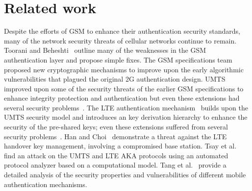 \documentclass[letterpaper,twocolumn]{sig-alternate}
\begin{document}
 

\section{Related work}

Despite the efforts of GSM to enhance their authentication security standards, many of the network security threats of cellular networks continue to remain. Toorani and Beheshti~\cite{toorani2008solutions} outline many of the weaknesses in the GSM authentication layer and propose simple fixes. The GSM specifications team~\cite{arkko2006extensible,haverinen2006extensible} proposed new cryptographic mechanisms to improve upon the early algorithmic vulnerabilities that plagued the original 2G authentication design. UMTS improved upon some of the security threats of the earlier GSM specifications to enhance integrity protection and authentication but even these extensions had several security problems~\cite{mobarhan2012evaluation}. The LTE authentication mechanism~\cite{bikos2013lte} builds upon the UMTS security model and introduces an key derivation hierarchy to enhance the security of the pre-shared keys; even these extensions suffered from several security problems~\cite{bikos2013lte, han2014security,tsay2012vulnerability}. Han and Choi~\cite{han2014security} demonstrate a threat against the LTE handover key management, involving a compromised base station. Tsay et al.~\cite{tsay2012vulnerability} find an attack on the UMTS and LTE AKA protocols using an automated protocol analyzer based on a computational model. Tang et al.~\cite{tang2013analysis} provide a detailed analysis of the security properties and vulnerabilities of different mobile authentication mechanisms.
\end{document}
